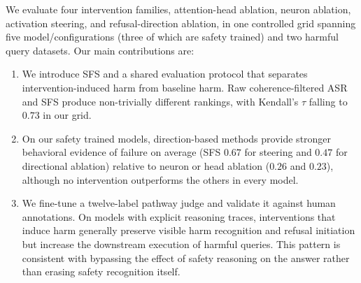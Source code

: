 We evaluate four intervention families, attention-head ablation, neuron ablation, activation steering, and refusal-direction ablation, in one controlled grid spanning five model/configurations (three of which are safety trained) and two harmful query datasets. Our main contributions are:

\begin{enumerate}[leftmargin=1.4em, itemsep=1pt, topsep=2pt]
    \item We introduce SFS and a shared evaluation protocol that separates intervention-induced harm from baseline harm. Raw coherence-filtered ASR and SFS produce non-trivially different rankings, with Kendall's $\tau$ falling to $0.73$ in our grid. 
    \item On our safety trained models, direction-based methods provide stronger behavioral evidence of failure on average (SFS $0.67$ for steering and $0.47$ for directional ablation) relative to neuron or head ablation ($0.26$ and $0.23$), although no intervention outperforms the others in every model.
    \item We fine-tune a twelve-label pathway judge and validate it against human annotations. On models with explicit reasoning traces, interventions that induce harm generally preserve visible harm recognition and refusal initiation but increase the downstream execution of harmful queries. This pattern is consistent with bypassing the effect of safety reasoning on the answer rather than erasing safety recognition itself. 
\end{enumerate}

